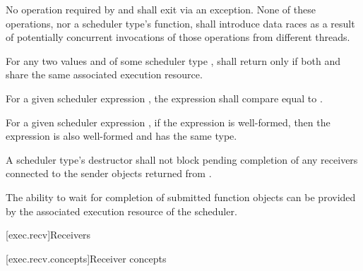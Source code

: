 \pnum
No operation required by
 and
shall exit via an exception.
None of these operations,
nor a scheduler type's  function,
shall introduce data races
as a result of potentially concurrent invocations
of those operations from different threads.

\pnum
For any two values  and 
of some scheduler type ,
 shall return 
only if both  and  share
the same associated execution resource.

\pnum
For a given scheduler expression ,
the expression
shall compare equal to .

\pnum
For a given scheduler expression ,
if the expression  is well-formed,
then the expression 
is also well-formed and has the same type.

\pnum
A scheduler type's destructor shall not block
pending completion of any receivers
connected to the sender objects returned from .
\begin{note}
The ability to wait for completion of submitted function objects
can be provided by the associated execution resource of the scheduler.
\end{note}

[exec.recv]{Receivers}

[exec.recv.concepts]{Receiver concepts}

